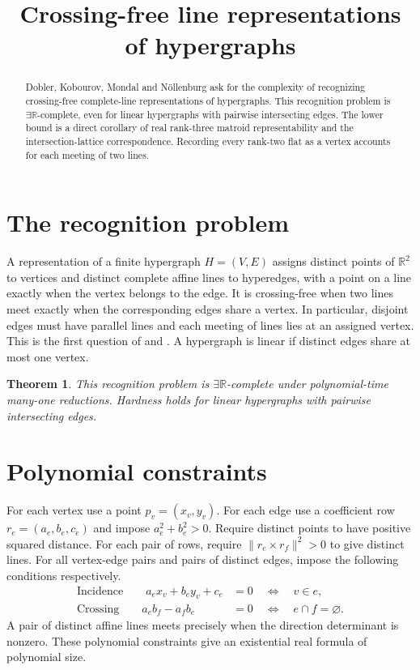 \documentclass[11pt,a4paper]{amsart}
\title[Crossing-free line representations]{Crossing-free line representations of hypergraphs}
\date{}
\newtheorem{theorem}{Theorem}
\newcommand{\ER}{\ensuremath{\exists\mathbb R}}
\begin{document}
\begin{abstract}
Dobler, Kobourov, Mondal and N\"ollenburg ask for the complexity of recognizing crossing-free complete-line representations of hypergraphs. This recognition problem is \ER-complete, even for linear hypergraphs with pairwise intersecting edges. The lower bound is a direct corollary of real rank-three matroid representability and the intersection-lattice correspondence. Recording every rank-two flat as a vertex accounts for each meeting of two lines.
\end{abstract}
\maketitle

\section{The recognition problem}
A representation of a finite hypergraph $H=(V,E)$ assigns distinct points of $\mathbb R^2$ to vertices and distinct complete affine lines to hyperedges, with a point on a line exactly when the vertex belongs to the edge. It is crossing-free when two lines meet exactly when the corresponding edges share a vertex. In particular, disjoint edges must have parallel lines and each meeting of lines lies at an assigned vertex. This is the first question of \cite[\S7]{dobleretal} and \cite[\S5.6]{doblerthesis}. A hypergraph is linear if distinct edges share at most one vertex.

\begin{theorem}
This recognition problem is \ER-complete under polynomial-time many-one reductions. Hardness holds for linear hypergraphs with pairwise intersecting edges.
\end{theorem}

\section{Polynomial constraints}
For each vertex use a point $p_v=(x_v,y_v)$. For each edge use a coefficient row $r_e=(a_e,b_e,c_e)$ and impose $a_e^2+b_e^2>0$. Require distinct points to have positive squared distance. For each pair of rows, require $\|r_e\times r_f\|^2>0$ to give distinct lines. For all vertex-edge pairs and pairs of distinct edges, impose the following conditions respectively.
\begin{align*}
\text{Incidence}\qquad a_e x_v+b_e y_v+c_e&=0 \quad\Longleftrightarrow\quad v\in e,\\
\text{Crossing}\qquad a_e b_f-a_f b_e&=0 \quad\Longleftrightarrow\quad e\cap f=\varnothing.
\end{align*}
A pair of distinct affine lines meets precisely when the direction determinant is nonzero. These polynomial constraints give an existential real formula of polynomial size.
\end{document}
